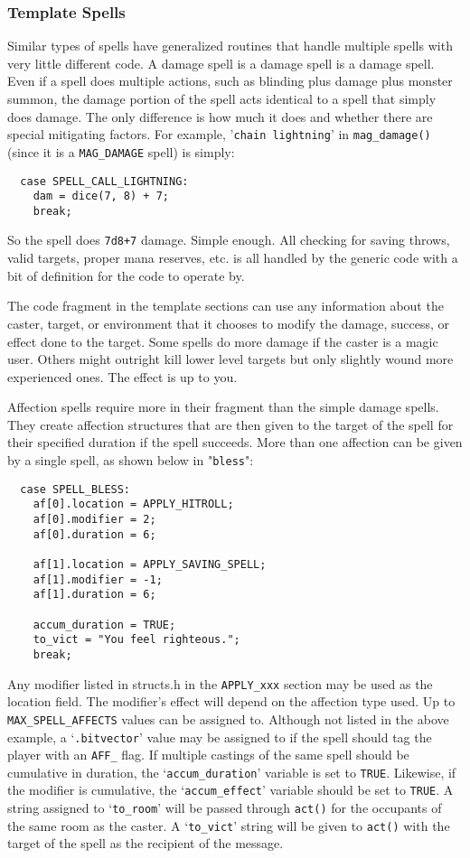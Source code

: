 \documentclass[11pt]{article}
\begin{document}
\subsubsection{Template Spells}
Similar types of spells have generalized routines that handle multiple spells with very little different code.  A damage spell is a damage spell is a damage spell.  Even if a spell does multiple actions, such as blinding plus damage plus monster summon, the damage portion of the spell acts identical to a spell that simply does damage.  The only difference is how much it does and whether there are special mitigating factors.  For example, '\texttt{chain lightning}' in \texttt{mag\_damage()} (since it is a \texttt{MAG\_DAMAGE} spell) is simply:
\begin{verbatim}
  case SPELL_CALL_LIGHTNING:
    dam = dice(7, 8) + 7;
    break;
\end{verbatim}
So the spell does \texttt{7d8+7} damage. Simple enough.  All checking for saving throws, valid targets, proper mana reserves, etc. is all handled by the generic code with a bit of definition for the code to operate by.
\par
The code fragment in the template sections can use any information about the caster, target, or environment that it chooses to modify the damage, success, or effect done to the target.  Some spells do more damage if the caster is a magic user.  Others might outright kill lower level targets but only slightly wound more experienced ones.  The effect is up to you.
\par
Affection spells require more in their fragment than the simple damage spells.  They create affection structures that are then given to the target of the spell for their specified duration if the spell succeeds.  More than one affection can be given by a single spell, as shown below in "\texttt{bless}":
\begin{verbatim}
  case SPELL_BLESS:
    af[0].location = APPLY_HITROLL;
    af[0].modifier = 2;
    af[0].duration = 6;

    af[1].location = APPLY_SAVING_SPELL;
    af[1].modifier = -1;
    af[1].duration = 6;

    accum_duration = TRUE;
    to_vict = "You feel righteous.";
    break;
\end{verbatim}
Any modifier listed in structs.h in the \texttt{APPLY\_xxx} section may be used as the location field.  The modifier's effect will depend on the affection type used. Up to \texttt{MAX\_SPELL\_AFFECTS} values can be assigned to. Although not listed in the above example, a `\texttt{.bitvector}' value may be assigned to if the spell should tag the player with an \texttt{AFF\_} flag. If multiple castings of the same spell should be cumulative in duration, the `\texttt{accum\_duration}' variable is set to \texttt{TRUE}.  Likewise, if the modifier is cumulative, the `\texttt{accum\_effect}' variable should be set to \texttt{TRUE}. A string assigned to `\texttt{to\_room}' will be passed through \texttt{act()} for the occupants of the same room as the caster. A `\texttt{to\_vict}' string will be given to \texttt{act()} with the target of the spell as the recipient of the message.
\end{document}
